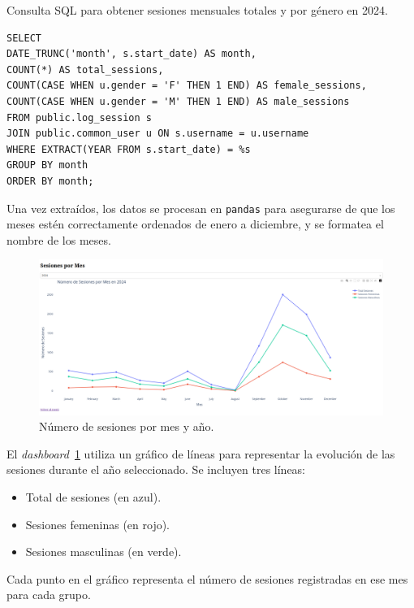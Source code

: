 \documentclass[a4paper, 12pt]{book}
\begin{document}
\begin{listing}[h!]
\caption{Consulta SQL para obtener sesiones mensuales totales y por género en 2024.}
\label{lst:sql_monthly_sessions_gender_2024}
\begin{verbatim}
SELECT 
DATE_TRUNC('month', s.start_date) AS month,
COUNT(*) AS total_sessions,
COUNT(CASE WHEN u.gender = 'F' THEN 1 END) AS female_sessions,
COUNT(CASE WHEN u.gender = 'M' THEN 1 END) AS male_sessions
FROM public.log_session s
JOIN public.common_user u ON s.username = u.username
WHERE EXTRACT(YEAR FROM s.start_date) = %s
GROUP BY month
ORDER BY month;
\end{verbatim}
\end{listing}

Una vez extraídos, los datos se procesan en \texttt{pandas} para asegurarse de que los meses estén correctamente ordenados de enero a diciembre, y se formatea el nombre de los meses.

\begin{figure}[H]
  \centering
  \includegraphics[width=1.1\textwidth]{img/2c.png}
  \caption{Número de sesiones por mes y año.}
  \label{fig:2c}
\end{figure}

El \textit{dashboard}~\ref{fig:2c} utiliza un gráfico de líneas para representar la evolución de las sesiones durante el año seleccionado. Se incluyen tres líneas:

\begin{itemize}
  \item Total de sesiones (en azul).
  \item Sesiones femeninas (en rojo).
  \item Sesiones masculinas (en verde).
\end{itemize}

Cada punto en el gráfico representa el número de sesiones registradas en ese mes para cada grupo.
\end{document}
